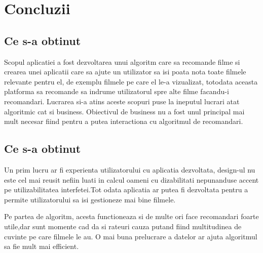 \chapter{Concluzii}
\section{Ce s-a obtinut}

\par Scopul aplicatiei a fost dezvoltarea unui algoritm care sa recomande filme si crearea unei aplicatii care sa ajute un utilizator sa isi poata nota toate filmele relevante pentru el, de exemplu filmele pe care el le-a vizualizat, totodata aceasta platforma sa recomande sa indrume utilizatorul spre alte filme facandu-i recomandari. Lucrarea si-a atins aceste scopuri puse la ineputul lucrari atat algoritmic cat si business. Obiectivul de business nu a fost unul principal mai mult necesar fiind pentru a putea interactiona cu algoritmul de recomandari.

\section{Ce s-a obtinut}
\par Un prim lucru ar fi experienta utilizatorului cu aplicatia dezvoltata, design-ul nu este cel mai reusit nefiin luati in calcul oameni cu dizabilitati nepunanduse accent pe utilizabilitatea interfetei.Tot odata aplicatia ar putea fi dezvoltata pentru a permite utilizatorului sa isi gestioneze mai bine filmele.
\par Pe partea de algoritm, acesta functioneaza si de multe ori face recomandari foarte utile,dar sunt momente cad da si rateuri cauza putand fiind multitudinea de cuvinte pe care filmele le au. O mai buna prelucrare a datelor ar ajuta algoritmul sa fie mult mai efficient.